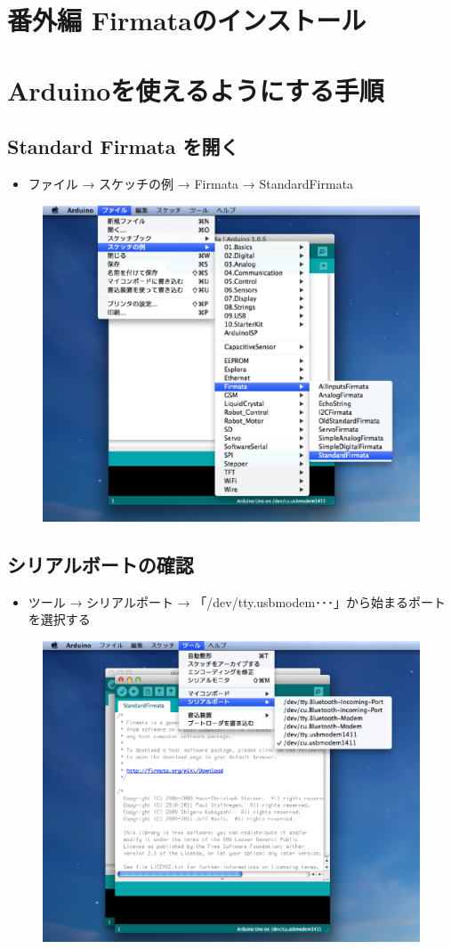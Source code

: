 \documentclass[11pt,a4paper]{jarticle}
\begin{document}
\section*{\LARGE{番外編 Firmataのインストール}}

\section{Arduinoを使えるようにする手順}
\subsection{Standard Firmata を開く}
\begin{itemize}
\item ファイル → スケッチの例 → Firmata → StandardFirmata
\end{itemize}

 \begin{figure}[h]
 \centering
 \includegraphics[width=0.63\columnwidth]{img/firmata3.eps}
\end{figure}

\subsection{シリアルボートの確認}
\begin{itemize}
\item ツール → シリアルポート → 「/dev/tty.usbmodem･･･」から始まるポートを選択する
\end{itemize}

 \begin{figure}[h]
 \centering
 \includegraphics[width=0.63\columnwidth]{img/firmata5.eps}
\end{figure}
\end{document}
